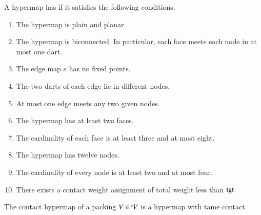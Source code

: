 \documentclass{llncs}
\def\op#1{{\hbox{#1}}}
\begin{document}
\begin{definition}
  A hypermap has  if it satisfies the following 
  conditions.
%
%
%
%
%
%
%
%
%
\begin{enumerate}
\item {} The hypermap is plain and planar.
\item {} The hypermap is biconnected.  In particular,
  each face meets each node in at most one dart.
\item {} The edge map $e$ has no fixed points.
\item {} The two darts of each edge lie in different
  nodes.
\item {} At most one edge meets any two given
  nodes.
\item {} The hypermap has at least two faces.
\item {} The cardinality of each face is at least three
  and at most eight.
\item {} The hypermap has twelve nodes.
\item {} The cardinality of every node is at least two  and at most four.
\item {} There exists a contact weight assignment of total
  weight less than $\op{tgt}$.
\end{enumerate}
%
\end{definition}



\begin{theorem} The contact hypermap of a 
  packing $V\in {\mathcal V}$ is a hypermap with tame contact.
\end{theorem}
%
%
%
\end{document}
